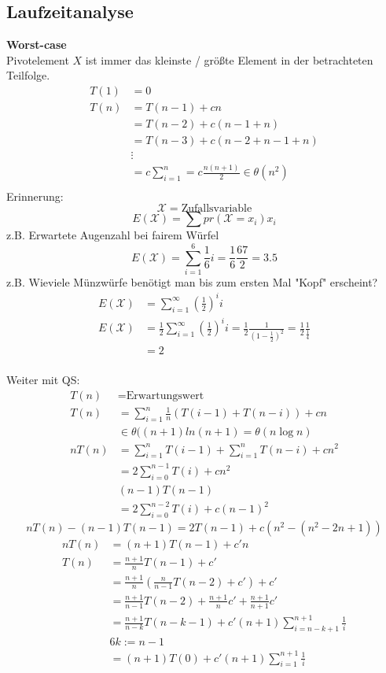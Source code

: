 \subsection{Laufzeitanalyse}
\textbf{Worst-case}\\
Pivotelement $X$ ist immer das kleinste / größte Element in der betrachteten Teilfolge.
\begin{align*}
T(1)&=0\\
T(n)&=T(n-1)+cn\\
&=T(n-2)+c(n-1+n)\\
&=T(n-3)+c(n-2+n-1+n)\\
&\vdots\\
&=c\sum_{i=1}^n=c\frac{n(n+1)}{2}\in \theta(n^2)\\
\end{align*}
Erinnerung:\\
$$\mathcal X =\mbox{Zufallsvariable}$$
$$E(\mathcal X)=\sum pr(\mathcal X= x_i)x_i$$
z.B. Erwartete Augenzahl bei fairem Würfel
$$E(\mathcal X)=\sum_{i=1}^6\frac{1}{6}i=\frac{1}{6}\frac{67}{2}=3.5$$
z.B. Wieviele Münzwürfe benötigt man bis zum ersten Mal "Kopf" erscheint?
\begin{align*}
E(\mathcal X)&=\sum_{i=1}^\infty \left(\frac{1}{2}\right)^ii\\
E(\mathcal X)&=\frac{1}{2}\sum_{i=1}^\infty\left(\frac{1}{2}\right)^ii=\frac{1}{2}\frac{1}{(1-\frac{1}{2})^2}=\frac{1}{2}\frac{1}{\frac{1}{4}}\\&=2
\end{align*}
\\[.5em]
Weiter mit QS:\\
\begin{align*}
T(n) &= \mbox{Erwartungswert}\\
T(n)&=\sum_{i=1}^n\frac{1}{n}\left(T(i-1)+T(n-i)\right)+cn\\
&\in \theta((n+1)ln(n+1)=\theta(n\log n)\\
nT(n)&=\sum_{i=1}^nT(i-1)+\sum_{i=1}^nT(n-i) +cn^2\\
&=2\sum_{i=0}^{n-1}T(i)+cn^2\\
&(n-1)T(n-1)\\
&=2\sum_{i=0}^{n-2}T(i)+c(n-1)^2\end{align*}
\tiny\[nT(n)-(n-1)T(n-1)=2T(n-1)+c(n^2-(n^2-2n+1))\]
\small\begin{align*}
nT(n)&=(n+1)T(n-1)+c'n\\
T(n)&=\frac{n+1}{n}T(n-1)+c'\\
&=\frac{n+1}{n}\left(\frac{n}{n-1}T(n-2)+c'\right)+c'\\
&=\frac{n+1}{n-1}T(n-2)+\frac{n+1}{n}c'+\frac{n+1}{n+1}c'\\
&=\frac{n+1}{n-k}T(n-k-1)+c'(n+1)\sum_{i=n-k+1}^{n+1}\frac{1}{i}\\
&6k:=n-1\\
&=(n+1)T(0)+c'(n+1)\sum_{i=1}^{n+1}\frac{1}{i}
\end{align*}
\normalsize